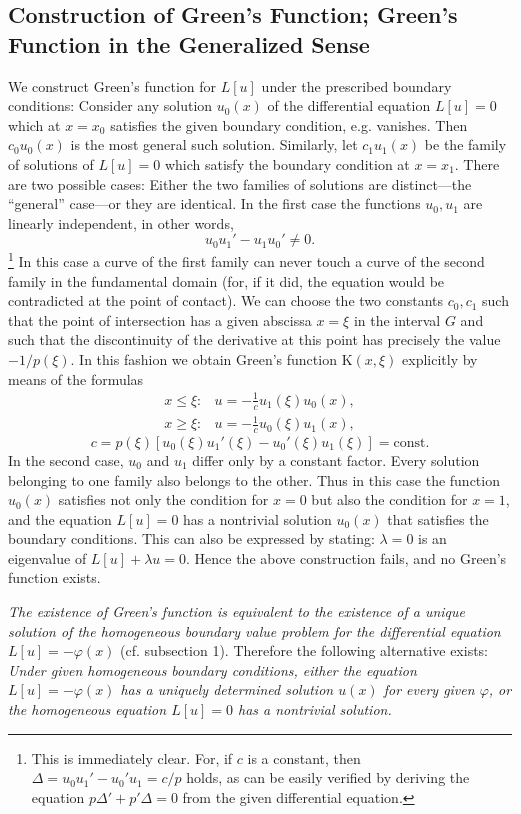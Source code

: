 \subsection{Construction of Green's Function; Green's Function in the Generalized Sense}
We construct Green's function for $L[u]$ under the prescribed boundary conditions: Consider any solution $u_0(x)$ of the differential equation $L[u]=0$ which at $x=x_0$ satisfies the given boundary condition, e.g. vanishes. Then $c_0u_0(x)$ is the most general such solution. Similarly, let $c_1u_1(x)$ be the family of solutions of $L[u]=0$ which satisfy the boundary condition at $x=x_1$. There are two possible cases: Either the two families of solutions are distinct---the ``general'' case---or they are identical. In the first case the functions $u_0,u_1$ are linearly independent, in other words,
\[
u_0u_1'-u_1u_0'\ne0.
\]
\footnote{This is immediately clear. For, if $c$ is a constant, then $\Delta=u_0u_1'-u_0'u_1=c/p$ holds, as can be easily verified by deriving the equation $p\Delta'+p'\Delta=0$ from the given differential equation.}
In this case a curve of the first family can never touch a curve of the second family in the fundamental domain (for, if it did, the equation would be contradicted at the point of contact). We can choose the two constants $c_0,c_1$ such that the point of intersection has a given abscissa $x=\xi$ in the interval $G$ and such that the discontinuity of the derivative at this point has precisely the value $-1/p(\xi)$. In this fashion we obtain Green's function $\mathrm K(x,\xi)$ explicitly by means of the formulas
\[
\begin{array}{lll}
x\le\xi:&\displaystyle u=-\frac1c u_1(\xi)u_0(x),\\[6pt]
x\ge\xi:&\displaystyle u=-\frac1c u_0(\xi)u_1(x),
\end{array}
\]
\[
c=p(\xi)[u_0(\xi)u_1'(\xi)-u_0'(\xi)u_1(\xi)]=\mathrm{const.}
\]
In the second case, $u_0$ and $u_1$ differ only by a constant factor. Every solution belonging to one family also belongs to the other. Thus in this case the function $u_0(x)$ satisfies not only the condition for $x=0$ but also the condition for $x=1$, and the equation $L[u]=0$ has a nontrivial solution $u_0(x)$ that satisfies the boundary conditions. This can also be expressed by stating: $\lambda=0$ is an eigenvalue of $L[u]+\lambda u=0$. Hence the above construction fails, and no Green's function exists.

\emph{The existence of Green's function is equivalent to the existence of a unique solution of the homogeneous boundary value problem for the differential equation $L[u]=-\varphi(x)$} (cf. subsection 1). Therefore the following alternative exists: \emph{Under given homogeneous boundary conditions, either the equation $L[u]=-\varphi(x)$ has a uniquely determined solution $u(x)$ for every given $\varphi$, or the homogeneous equation $L[u]=0$ has a nontrivial solution.}


